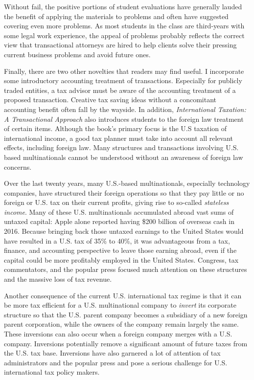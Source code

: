 Without fail, the positive portions of student evaluations have generally lauded the benefit of applying the materials to problems and often have suggested covering even more problems.  As most students in the class are third-years with some legal work experience, the appeal of problems probably reflects the correct view that transactional attorneys are hired to help clients solve their pressing current business problems and avoid future ones.  

Finally, there are two other novelties that readers may find useful.  I incorporate some introductory accounting treatment of transactions.  Especially for publicly traded entities, a tax advisor must be aware of the accounting treatment of a proposed transaction.  Creative tax saving ideas without a concomitant accounting benefit often fall by the wayside.  In addition,  \textit{International Taxation: A Transactional Approach} also introduces students to the foreign law treatment of certain items.  Although the book's primary focus is the U.S taxation of international income, a good tax planner must take into account all relevant effects, including foreign law.  Many structures and transactions involving U.S. based multinationals cannot be understood without an awareness of foreign law concerns.

 Over the last twenty years, many U.S.-based multinationals, especially technology companies, have structured their foreign operations so that they pay little or no foreign or U.S. tax on their current profits, giving rise to so-called \emph{stateless income}.  Many of these U.S. multinationals accumulated abroad vast sums of untaxed capital: Apple alone reported having \$200 billion of overseas cash in 2016. Because bringing back those untaxed earnings to the United States would have resulted in a U.S. tax of 35\% to 40\%, it was advantageous from a tax, finance, and accounting perspective to leave those earning abroad, even if the capital could be more profitably employed in the United States.  Congress, tax commentators, and the popular press focused much attention on these structures and the massive loss of tax revenue.  

Another consequence of the current U.S. international tax regime is that it can be more tax efficient for a U.S. multinational company to \textit{invert} its corporate structure so that the U.S. parent company becomes a subsidiary of a new foreign parent corporation, while the owners of the company remain largely the same.  These inversions can also occur when a foreign company merges with a U.S. company.  Inversions potentially remove a significant amount of future taxes from the U.S. tax base.  Inversions have also garnered a lot of attention of tax administrators and the popular press and pose a serious challenge for U.S. international tax policy makers.     

